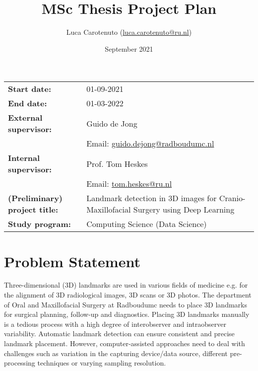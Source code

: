 \documentclass{article}
\title{MSc Thesis Project Plan}
\author{Luca Carotenuto (\href{mailto:luca.carotenuto@ru.nl}{luca.carotenuto@ru.nl})}
\date{September 2021}
\begin{document}
\maketitle


\begin{table}[h]
\begin{tabularx}{\textwidth}{lL}
\textbf{Start date:}                  & 01-09-2021                       \\
\textbf{End date:}                    & 01-03-2022                       \\
\textbf{External supervisor:}                  & Guido de Jong\\ & Email: \href{mailto:guido.dejong@radboudumc.nl}{guido.dejong@radboudumc.nl}                           \\
\textbf{Internal supervisor:}                  & Prof. Tom Heskes\\ &  Email: \href{tom.heskes@ru.nl}{tom.heskes@ru.nl}                                 \\
\textbf{(Preliminary) project title:} &  Landmark detection in 3D images for Cranio-Maxillofacial Surgery using Deep Learning                            \\
\textbf{Study program:}               & Computing Science (Data Science)
\end{tabularx}
\end{table}
 
\section{Problem Statement}
Three-dimensional (3D) landmarks are used in various fields of medicine e.g. for the alignment of 3D radiological images, 3D scans or 3D photos. The department of Oral and Maxillofacial Surgery at Radboudumc needs to place 3D landmarks for surgical planning, follow-up and diagnostics. Placing 3D landmarks manually is a tedious process with a high degree of interobserver and intraobserver variability. Automatic landmark detection can ensure consistent and precise landmark placement. However, computer-assisted approaches need to deal with challenges such as variation in the capturing device/data source, different pre-processing techniques or varying sampling resolution. 
\end{document}
